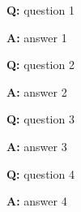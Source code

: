 \textbf{Q:} question 1

\textbf{A:} answer 1

\textbf{Q:} question 2

\textbf{A:} answer 2

\textbf{Q:} question 3

\textbf{A:} answer 3

\textbf{Q:} question 4

\textbf{A:} answer 4
